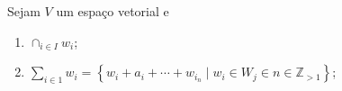 
\begin{proposition}
	Sejam $V$ um espaço vetorial e
\end{proposition}

\begin{enumerate}
	\item

	      \begin{math}
		      \cap_{i\in I}w_{i}
	      \end{math};

	\item

	      \begin{math}
		      \sum_{i\in 1}w_{i}=
		      \left\{
		      w_{i}+a_{i}+\dotsb+w_{i_{n}}
		      \mid w_{i}\in W_{j}\in
		      n\in\mathbb{Z}_{>1}
		      \right\}
	      \end{math};

\end{enumerate}









